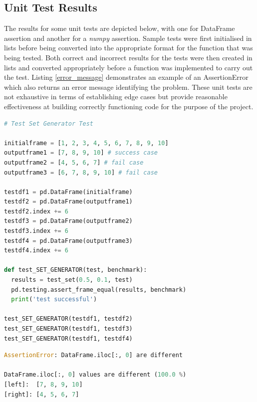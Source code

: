 \documentclass[10pt,onecolumn,letterpaper]{article}
\begin{document}
\subsection{Unit Test Results} 

The results for some unit tests are depicted below, with one for DataFrame assertion and another for a \textit{numpy} assertion. Sample tests were first initialised in lists before being converted into the appropriate format for the function that was being tested. Both correct and incorrect results for the tests were then created in lists and converted appropriately before a function was implemented to carry out the test. Listing \ref{error_message} demonstrates an example of an AssertionError which also returns an error message identifying the problem. These unit tests are not exhaustive in terms of establishing edge cases but provide reasonable effectiveness at building correctly functioning code for the purpose of the project.

\begin{lstlisting}[language=Python, breaklines=true, caption={Example of a DataFrame comparison test.}]
# Test Set Generator Test

initialframe = [1, 2, 3, 4, 5, 6, 7, 8, 9, 10]
outputframe1 = [7, 8, 9, 10] # success case
outputframe2 = [4, 5, 6, 7] # fail case
outputframe3 = [6, 7, 8, 9, 10] # fail case

testdf1 = pd.DataFrame(initialframe)
testdf2 = pd.DataFrame(outputframe1)
testdf2.index += 6
testdf3 = pd.DataFrame(outputframe2)
testdf3.index += 6
testdf4 = pd.DataFrame(outputframe3)
testdf4.index += 6

def test_SET_GENERATOR(test, benchmark):
  results = test_set(0.5, 0.1, test)
  pd.testing.assert_frame_equal(results, benchmark)
  print('test successful')

test_SET_GENERATOR(testdf1, testdf2)
test_SET_GENERATOR(testdf1, testdf3)
test_SET_GENERATOR(testdf1, testdf4)
\end{lstlisting} 

\begin{lstlisting}[language=Python, breaklines=true, caption={Assertion Error raised by the second fail case of the Test Set Generator Test.}, label={error_message}]
AssertionError: DataFrame.iloc[:, 0] are different

DataFrame.iloc[:, 0] values are different (100.0 %)
[left]:  [7, 8, 9, 10]
[right]: [4, 5, 6, 7]
\end{lstlisting} 
\end{document}
